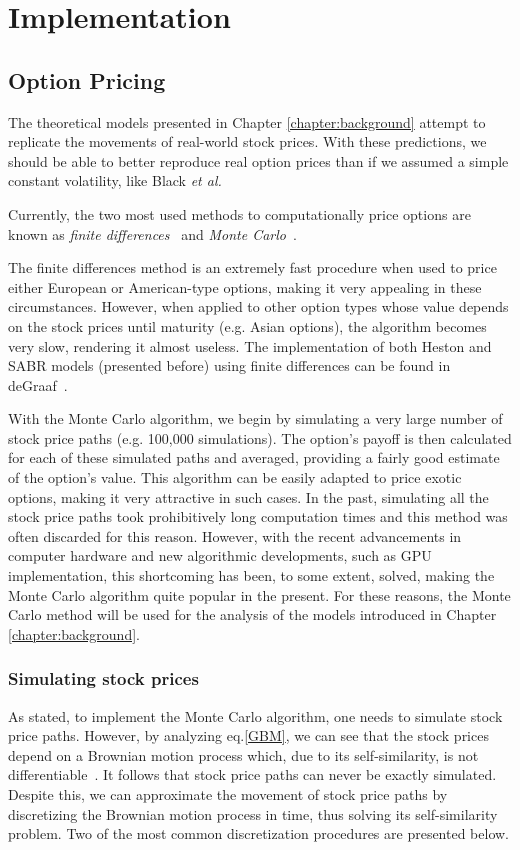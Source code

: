 \chapter{Implementation}
\label{chapter:implementation}
\section{Option Pricing}
\label{section:Option Pricing}
The theoretical models presented in Chapter \ref{chapter:background} attempt to replicate the movements of real-world stock prices. With these predictions, we should be able to better reproduce real option prices than if we assumed a simple constant volatility, like Black \textit{et al.}

Currently, the two most used methods to computationally price options are known as \emph{finite differences}~\cite{Hull} and \emph{Monte Carlo}~\cite{Glasserman}.

The finite differences method is an extremely fast procedure when used to price either European or American-type options, making it very appealing in these circumstances. However, when applied to other option types whose value depends on the stock prices until maturity (e.g. Asian options), the algorithm becomes very slow, rendering it almost useless.
The implementation of both Heston and SABR models (presented before) using finite differences can be found in deGraaf~\cite{deGraaf}.


With the Monte Carlo algorithm, we begin by simulating a very large number of stock price paths (e.g. 100,000 simulations). The option's payoff is then calculated for each of these simulated paths and averaged, providing a fairly good estimate of the option's value. This algorithm can be easily adapted to price exotic options, making it very attractive in such cases.
In the past, simulating all the stock price paths took prohibitively long computation times and this method was often discarded for this reason. However, with the recent advancements in computer hardware and new algorithmic developments, such as GPU implementation, this shortcoming has been, to some extent, solved, making the Monte Carlo algorithm quite popular in the present.
For these reasons, the Monte Carlo method will be used for the analysis of the models introduced in Chapter \ref{chapter:background}.


\subsection{Simulating stock prices}
\label{subsection:Simulating stock prices}
As stated, to implement the Monte Carlo algorithm, one needs to simulate stock price paths. However, by analyzing eq.\eqref{GBM}, we can see that the stock prices depend on a Brownian motion process which, due to its self-similarity, is not differentiable~\cite{Mikosch}. It follows that stock price paths can never be exactly simulated. Despite this, we can approximate the movement of stock price paths by discretizing the Brownian motion process in time, thus solving its self-similarity problem. Two of the most common discretization procedures are presented below.

